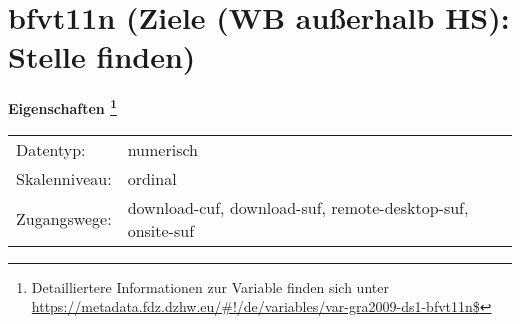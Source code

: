 
    \setcounter{footnote}{0}

    \vspace*{-1.8cm}
	\section{bfvt11n (Ziele (WB außerhalb HS): Stelle finden)}
	\label{section:bfvt11n}



    \vspace*{0.5cm}
    \noindent\textbf{Eigenschaften
	\footnote{Detailliertere Informationen zur Variable finden sich unter
		\url{https://metadata.fdz.dzhw.eu/\#!/de/variables/var-gra2009-ds1-bfvt11n$}}}\\
	\begin{tabularx}{\hsize}{@{}lX}
	Datentyp: & numerisch \\
	Skalenniveau: & ordinal \\
	Zugangswege: &
	  download-cuf, 
	  download-suf, 
	  remote-desktop-suf, 
	  onsite-suf
 \\
    \end{tabularx}



